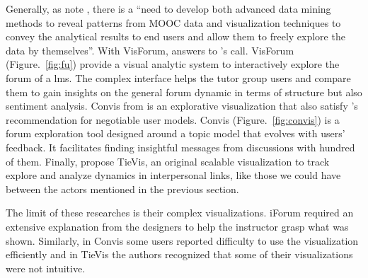 \documentclass[a4paper,twoside]{article}
\begin{document}
Generally, as note \cite{Qu2015}, there is a  ``need to develop both advanced data mining methods to reveal patterns from MOOC data and visualization techniques to convey the analytical results to end users and allow them to freely explore the data by themselves''.
With VisForum, \cite{Fu2017}  answers to \cite{Qu2015}'s call.  VisForum  (Figure.~\ref{fig:fu}) provide a visual analytic system to interactively explore the forum of a \gls{lms}.  The complex interface helps the tutor group users and compare them to gain insights on the general forum dynamic in terms of structure but also sentiment analysis.
Convis from \cite{Hoque2016} is an explorative visualization that also satisfy \cite{Bull2016}'s recommendation for negotiable user models.   Convis (Figure.~\ref{fig:convis}) is a forum exploration tool designed around a topic model that evolves with users' feedback.   It facilitates finding insightful messages from discussions with hundred of them. 
Finally, \cite{Guo2017} propose TieVis, an original scalable visualization to track explore and analyze dynamics in interpersonal links, like those we could have between the actors mentioned in the previous section.

The limit of these researches is their complex visualizations.  iForum required an extensive explanation from the designers to help the instructor grasp what was shown.  Similarly, in Convis some users reported difficulty to use the visualization efficiently and in TieVis the authors recognized that some of their visualizations were not intuitive.
\end{document}
